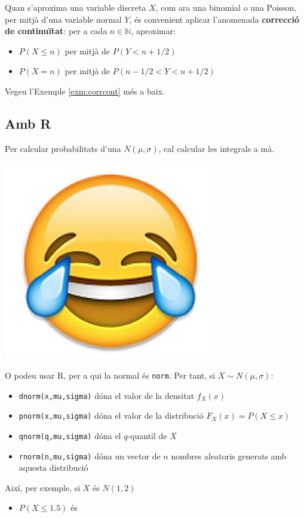 \documentclass[
]{book}
\providecommand{\tightlist}{%
  \setlength{\itemsep}{0pt}\setlength{\parskip}{0pt}}
\renewcommand{\leq}{\leqslant}
\newenvironment{rmdblock}[1]
  {
  \begin{itemize}
  \renewcommand{\labelitemi}{
    \raisebox{-.7\height}[0pt][0pt]{
      {\setkeys{Gin}{width=3em,keepaspectratio}\texttt{[image: Bioestadística-II\_files/figure-html/\#1]}}
    }
  }
  \setlength{\fboxsep}{1em}
  \begin{kframe}
  \item
  }
  {
  \end{kframe}
  \end{itemize}
  }
\newenvironment{rmdcaution}
  {\begin{rmdblock}{caution}}
  {\end{rmdblock}}
\theoremstyle{definition}
\theoremstyle{definition}
\theoremstyle{definition}
\theoremstyle{remark}
\begin{document}
\begin{rmdcaution}
Quan s'aproxima una variable discreta \(X\), com ara una binomial o una Poisson, per mitjà d'una variable normal \(Y\), és convenient aplicar l'anomenada \textbf{correcció de continuïtat}: per a cada \(n\in \mathbb{N}\), aproximar:

\begin{itemize}
\item
  \(P(X\leq n)\) per mitjà de \(P(Y< n+1/2)\)
\item
  \(P(X=n)\) per mitjà de \(P(n-1/2< Y< n+1/2)\)
\end{itemize}

Vegeu l'Exemple \ref{exm:corrcont} més a baix.
\end{rmdcaution}

\hypertarget{amb-r}{%
\subsection{Amb R}\label{amb-r}}

Per calcular probabilitats d'una \(N(\mu,\sigma)\), cal calcular les integrals a mà.

\begin{center}\includegraphics[width=0.2\linewidth]{Bioestadistica-II_files/figure-html/emorisa} \end{center}

O podeu usar R, per a qui la normal és \texttt{norm}. Per tant, si \(X\sim N(\mu,\sigma)\):

\begin{itemize}
\item
  \texttt{dnorm(x,mu,sigma)} dóna el valor de la densitat \(f_X(x)\)
\item
  \texttt{pnorm(x,mu,sigma)} dóna el valor de la distribució \(F_X(x)=P(X\leq x)\)
\item
  \texttt{qnorm(q,mu,sigma)} dóna el \(q\)-quantil de \(X\)
\item
  \texttt{rnorm(n,mu,sigma)} dóna un vector de \(n\) nombres aleatoris generats amb aquesta distribució
\end{itemize}

Així, per exemple, si \(X\) és \(N(1,2)\)

\begin{itemize}
\tightlist
\item
  \(P(X\leq 1.5)\) és
\end{itemize}
\end{document}
